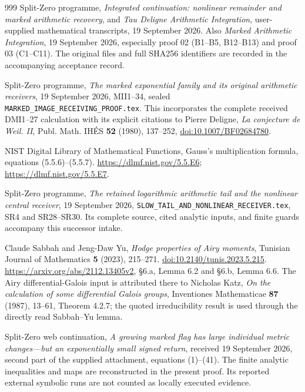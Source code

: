 \documentclass[11pt,a4paper]{article}
\begin{document}
\begin{thebibliography}{999}
Split-Zero programme, \emph{Integrated continuation: nonlinear
remainder and marked arithmetic recovery}, and \emph{Tau Deligne
Arithmetic Integration}, user-supplied mathematical transcripts,
19 September 2026. Also \emph{Marked Arithmetic Integration},
19 September 2026, especially proof 02 (B1--B5, B12--B13) and
proof 03 (C1--C11). The original files and full SHA256 identifiers
are recorded in the accompanying acceptance record.

Split-Zero programme, \emph{The marked exponential family and its
original arithmetic receivers}, 19 September 2026, MII1--34,
sealed \texttt{MARKED\_IMAGE\_RECEIVING\_PROOF.tex}.
This incorporates the complete received DMI1--27 calculation
with its explicit citations to Pierre Deligne, \emph{La conjecture
de Weil. II}, Publ. Math. IH\'ES \textbf{52} (1980), 137--252,
\href{https://doi.org/10.1007/BF02684780}{doi:10.1007/BF02684780}.

NIST Digital Library of Mathematical Functions,
Gauss's multiplication formula, equations (5.5.6)--(5.5.7).
\url{https://dlmf.nist.gov/5.5.E6};
\url{https://dlmf.nist.gov/5.5.E7}.

Split-Zero programme, \emph{The retained logarithmic arithmetic tail
and the nonlinear central receiver}, 19 September 2026,
\texttt{SLOW\_TAIL\_AND\_NONLINEAR\_RECEIVER.tex},
SR4 and SR28--SR30. Its complete source, cited analytic inputs,
and finite guards accompany this successor intake.

Claude Sabbah and Jeng-Daw Yu, \emph{Hodge properties of Airy moments},
Tunisian Journal of Mathematics \textbf{5} (2023), 215--271.
\href{https://doi.org/10.2140/tunis.2023.5.215}{doi:10.2140/tunis.2023.5.215}.
\url{https://arxiv.org/abs/2112.13405v2}, \S6.a, Lemma 6.2 and
\S6.b, Lemma 6.6. The Airy differential-Galois input is attributed
there to Nicholas Katz, \emph{On the calculation of some differential
Galois groups}, Inventiones Mathematicae \textbf{87} (1987), 13--61,
Theorem 4.2.7; the quoted irreducibility result is used through the
directly read Sabbah--Yu lemma.

Split-Zero web continuation, \emph{A growing marked flag has
large individual metric changes---but an exponentially small
signed return}, received 19 September 2026, second part of
the supplied attachment, equations (1)--(41).
The finite analytic inequalities and maps are reconstructed
in the present proof.  Its reported external symbolic runs
are not counted as locally executed evidence.


\end{thebibliography}
\end{document}
